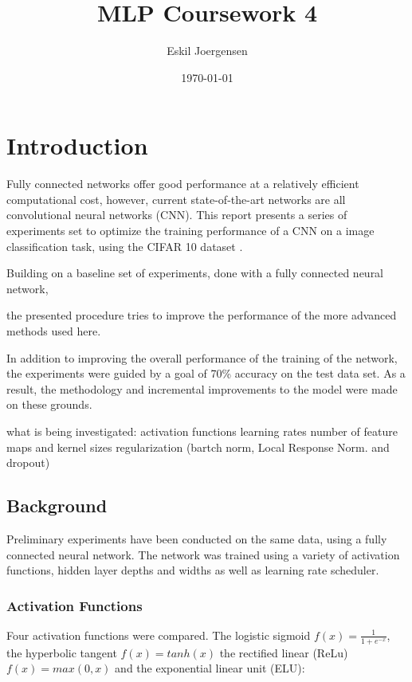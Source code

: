 \documentclass[]{article}
\title{MLP Coursework 4}
\author{Eskil Joergensen}
\date{\today}
\begin{document}
\maketitle

\section{Introduction}

Fully connected networks offer good performance at a relatively efficient computational cost, however, current state-of-the-art networks are all convolutional neural networks (CNN). This report presents a series of experiments set to optimize the training performance of a CNN on a image classification task, using the CIFAR 10 dataset \cite{cifar10}.

Building on a baseline set of experiments, done with a fully connected neural network, 

the presented procedure tries to improve the performance of the more advanced methods used here. 

In addition to improving the overall performance of the training of the network, the experiments were guided by a goal of 70\% accuracy on the test data set. As a result, the methodology and incremental improvements to the model were made on these grounds. 




what is being investigated:
activation functions
learning rates
number of feature maps and kernel sizes
regularization (bartch norm, Local Response Norm. and dropout)

\subsection{Background}

Preliminary experiments have been conducted on the same data, using a fully connected neural network. The network was trained using a variety of activation functions, hidden layer depths and widths as well as learning rate scheduler. 

\subsubsection{Activation Functions}

Four activation functions were compared. The logistic sigmoid $f(x)=\frac{1}{1+e^{-x}}$, the hyperbolic tangent $f(x)=tanh(x)$ the rectified linear (ReLu) $f(x)=max(0,x)$ and the exponential linear unit (ELU):
\end{document}
